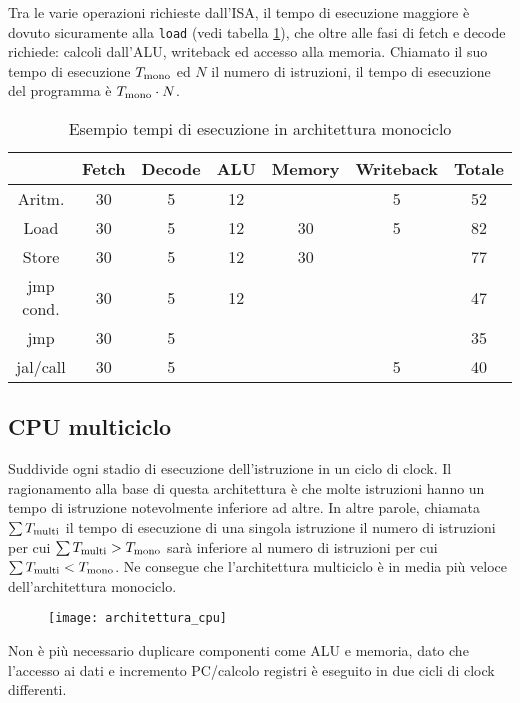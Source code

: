 \documentclass[../ace.tex]{subfiles}
\begin{document}
Tra le varie operazioni richieste dall'ISA, il tempo di esecuzione maggiore è dovuto sicuramente alla \lstinline{load} (vedi
tabella \ref{tab:tempi_esecuzione_monociclo}),
che oltre alle fasi di fetch e decode richiede: calcoli dall'ALU, writeback ed accesso alla memoria.
Chiamato il suo tempo di esecuzione $T_\text{mono}$ ed $N$ il numero di istruzioni, il tempo di esecuzione del programma è $T_\text{mono} \cdot N$.

\begin{table}[t]
    \centering
    \begin{tabular}{|c|c|c|c|c|c|c|}
        \hline
    & Fetch  & Decode & ALU & Memory & Writeback & Totale \\
    \hline
        Aritm.   & 30 & 5 &  12 &        &         5 &      52\\
        Load     & 30 & 5 &  12 &     30 &         5 &      82\\
        Store    & 30 & 5 &  12 &     30 &           &      77\\
        jmp cond.& 30 & 5 &  12 &        &           &      47\\
        jmp      & 30 & 5 &     &        &           &      35\\
        jal/call & 30 & 5 &     &        &         5 &      40\\
        \hline
    \end{tabular}
    \caption{Esempio tempi di esecuzione in architettura monociclo}
    \label{tab:tempi_esecuzione_monociclo}
\end{table}

\subsection{CPU multiciclo}
Suddivide ogni stadio di esecuzione dell'istruzione in un ciclo di clock.
Il ragionamento alla base di questa architettura è che molte istruzioni hanno un tempo di istruzione notevolmente inferiore ad altre.
In altre parole, chiamata $\sum T_\text{multi}$ il tempo di esecuzione di una singola istruzione il numero di istruzioni per cui
$\sum T_\text{multi} > T_\text{mono}$ sarà inferiore al numero di istruzioni per cui $\sum T_\text{multi} < T_\text{mono}$.
Ne consegue che l'architettura multiciclo è in media più veloce dell'architettura monociclo.

\begin{figure}[h]
    \centering
    \texttt{[image: architettura\_cpu]}
\end{figure}
Non è più necessario duplicare componenti come ALU e memoria, dato che l'accesso ai dati e incremento PC/calcolo registri è
eseguito in due cicli di clock differenti.
\end{document}
